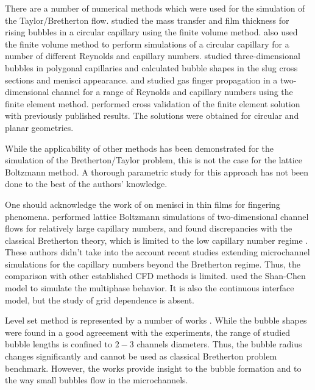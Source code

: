 \documentclass[preprint,12pt]{elsarticle}
\begin{document}
There are a number of numerical methods which
were used for the simulation of the Taylor/Bretherton flow.
\citet{vanbaten-circular} studied the mass transfer and film
thickness for rising bubbles in a circular capillary using the finite volume method.
\citet{kreutzer-pressure-drop} also used the finite volume method to perform
simulations of a circular capillary for a number of different
Reynolds and capillary numbers. \citeauthor{wong-films} \cite{wong-films,wong-pressure} studied
three-dimensional bubbles in
polygonal capillaries and calculated bubble shapes in the
slug cross sections and menisci appearance.
\citet{heil-bretherton} and \citet{ingham-plates} studied gas finger propagation in
a two-dimensional channel for a range of Reynolds and capillary
numbers using the finite element method. \citet{giavedoni-numerical} performed cross validation of the
finite element solution with previously published results.
The solutions were obtained for circular and planar geometries.

While the applicability of other methods has been demonstrated for the
simulation of the Bretherton/Taylor problem, this is not the case for
the lattice Boltzmann method. A thorough parametric study for this approach
has not been done to the best of the authors' knowledge.

One should acknowledge the work of \citet{pagonabarraga-fingers} on menisci
in thin films for fingering phenomena. \citet{sehgal-microchannel} performed lattice Boltzmann
simulations of two-dimensional channel flows for relatively large capillary numbers, and
found discrepancies with the classical Bretherton theory, which
is limited to the low capillary number regime \cite{giavedoni-numerical}. These authors didn't take
into
the account recent studies extending microchannel simulations for the capillary numbers
beyond the Bretherton regime. Thus, the comparison with other established CFD methods is limited.
\citeauthor{sehgal-microchannel} used the Shan-Chen model \cite{Shan-chen:extended} to simulate the
multiphase behavior. It is also
the continuous interface model, but the study of grid dependence is absent.

{\color{red}
Level set method is represented by a number of works \cite{fukugata-levelset,
lakehal-micro, carlson-comparison}. While the bubble shapes  were found in a good agreeement
with the experiments, the range of studied bubble lengths is confined to $2-3$ channels diameters.
Thus, the bubble radius changes significantly and cannot be used as classical Bretherton problem
benchmark. However, the works provide insight to the bubble formation and to the way small bubbles
flow in the
microchannels.} 
\end{document}
